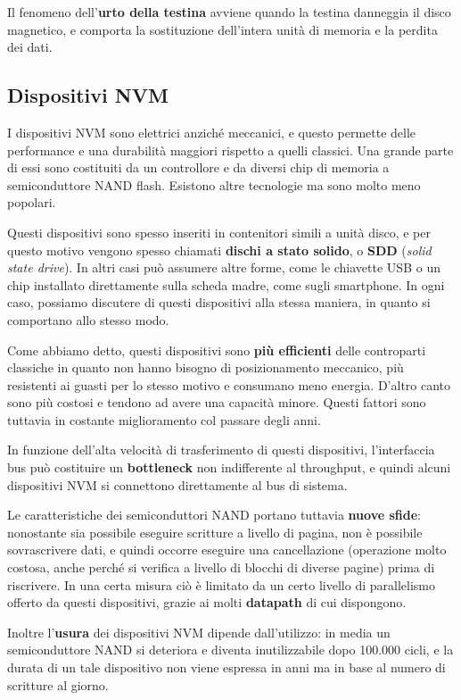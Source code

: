         Il fenomeno dell'\textbf{urto della testina} avviene quando la testina danneggia il disco magnetico, e comporta la sostituzione dell'intera unità di memoria e la perdita dei dati.
        
    \subsection{Dispositivi NVM}
        I dispositivi NVM sono elettrici anziché meccanici, e questo permette delle performance e una durabilità maggiori rispetto a quelli classici. Una grande parte di essi sono costituiti da un controllore e da diversi chip di memoria a semiconduttore NAND flash. Esistono altre tecnologie ma sono molto meno popolari.
        
        Questi dispositivi sono spesso inseriti in contenitori simili a unità disco, e per questo motivo vengono spesso chiamati \textbf{dischi a stato solido}, o \textbf{SDD} (\textit{solid state drive}). In altri casi può assumere altre forme, come le chiavette USB o un chip installato direttamente sulla scheda madre, come sugli smartphone. In ogni caso, possiamo discutere di questi dispositivi alla stessa maniera, in quanto si comportano allo stesso modo.
        
        Come abbiamo detto, questi dispositivi sono \textbf{più efficienti} delle controparti classiche in quanto non hanno bisogno di posizionamento meccanico, più resistenti ai guasti per lo stesso motivo e consumano meno energia. D'altro canto sono più costosi e tendono ad avere una capacità minore. Questi fattori sono tuttavia in costante miglioramento col passare degli anni.
        
        In funzione dell'alta velocità di trasferimento di questi dispositivi, l'interfaccia bus può costituire un \textbf{bottleneck} non indifferente al throughput, e quindi alcuni dispositivi NVM si connettono direttamente al bus di sistema.
        
        Le caratteristiche dei semiconduttori NAND portano tuttavia \textbf{nuove sfide}: nonostante sia possibile eseguire scritture a livello di pagina, non è possibile sovrascrivere dati, e quindi occorre eseguire una cancellazione (operazione molto costosa, anche perché si verifica a livello di blocchi di diverse pagine) prima di riscrivere. In una certa misura ciò è limitato da un certo livello di parallelismo offerto da questi dispositivi, grazie ai molti \textbf{datapath} di cui dispongono.
        
        Inoltre l'\textbf{usura} dei dispositivi NVM dipende dall'utilizzo: in media un semiconduttore NAND si deteriora e diventa inutilizzabile dopo 100.000 cicli, e la durata di un tale dispositivo non viene espressa in anni ma in base al numero di scritture al giorno.
        
